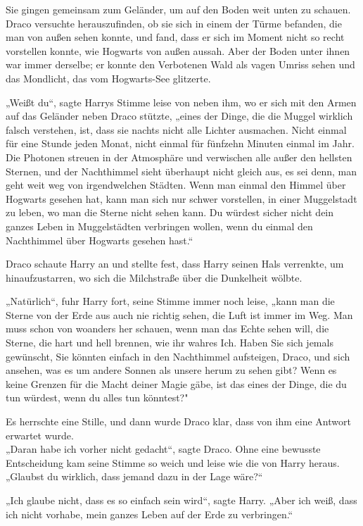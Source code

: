 {Sie gingen gemeinsam zum Geländer, um auf den Boden weit unten zu schauen. Draco versuchte herauszufinden, ob sie sich in einem der Türme befanden, die man von außen sehen konnte, und fand, dass er sich im Moment nicht so recht vorstellen konnte, wie Hogwarts von außen aussah. Aber der Boden unter ihnen war immer derselbe; er konnte den Verbotenen Wald als vagen Umriss sehen und das Mondlicht, das vom Hogwarts-See glitzerte.

„Weißt du“, sagte Harrys Stimme leise von neben ihm, wo er sich mit den Armen auf das Geländer neben Draco stützte, „eines der Dinge, die die Muggel wirklich falsch verstehen, ist, dass sie nachts nicht alle Lichter ausmachen. Nicht einmal für eine Stunde jeden Monat, nicht einmal für fünfzehn Minuten einmal im Jahr. Die Photonen streuen in der Atmosphäre und verwischen alle außer den hellsten Sternen, und der Nachthimmel sieht überhaupt nicht gleich aus, es sei denn, man geht weit weg von irgendwelchen Städten. Wenn man einmal den Himmel über Hogwarts gesehen hat, kann man sich nur schwer vorstellen, in einer Muggelstadt\\ zu leben, wo man die Sterne nicht sehen kann. Du würdest sicher nicht dein ganzes Leben in Muggelstädten verbringen wollen, wenn du einmal den Nachthimmel über Hogwarts gesehen hast.“

Draco schaute Harry an und stellte fest, dass Harry seinen Hals verrenkte, um hinaufzustarren, wo sich die Milchstraße über die Dunkelheit wölbte.

„Natürlich“, fuhr Harry fort, seine Stimme immer noch leise, „kann man die Sterne von der Erde aus auch nie richtig sehen, die Luft ist immer im Weg. Man muss schon von woanders her schauen, wenn man das Echte sehen will, die Sterne, die hart und hell brennen, wie ihr wahres Ich. Haben Sie sich jemals gewünscht, Sie könnten einfach in den Nachthimmel aufsteigen, Draco, und sich ansehen, was es um andere Sonnen als unsere herum zu sehen gibt? Wenn es keine Grenzen für die Macht deiner Magie gäbe, ist das eines der Dinge, die du tun würdest, wenn du alles tun könntest?"

Es herrschte eine Stille, und dann wurde Draco klar, dass von ihm eine Antwort erwartet wurde.\\ „Daran habe ich vorher nicht gedacht“, sagte Draco. Ohne eine bewusste Entscheidung kam seine Stimme so weich und leise wie die von Harry heraus. „Glaubst du wirklich, dass jemand dazu in der Lage wäre?“

„Ich glaube nicht, dass es so einfach sein wird“, sagte Harry. „Aber ich weiß, dass ich nicht vorhabe, mein ganzes Leben auf der Erde zu verbringen.“

}
